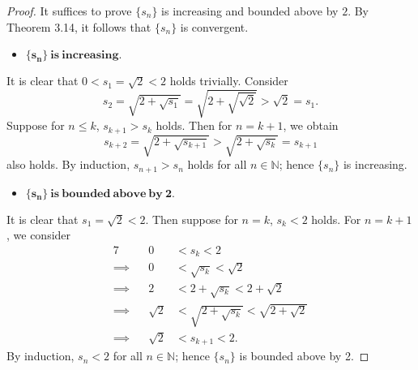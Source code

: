 \begin{Exercise}
\begin{proof}
It suffices to prove $\{s_n\}$ is increasing and bounded above by $2$. By Theorem 3.14, it follows that $\{s_n\}$ is convergent.

\begin{itemize}
\item $\mathbf{\{s_n\}\ is\ increasing.}$ 
\end{itemize}
It is clear that $0<s_1=\sqrt{2}<2$ holds trivially.
Consider
$$
s_2 = \sqrt{2+\sqrt{s_1}} = \sqrt{2+\sqrt{\sqrt{2}}} > \sqrt{2} = s_1.
$$
Suppose for $n\leq k$, $s_{k+1}>s_k$ holds. Then for $n = k+1$, we obtain
$$
s_{k+2} = \sqrt{2+\sqrt{s_{k+1}}} > \sqrt{2+\sqrt{s_k}} = s_{k+1}
$$
also holds. By induction, $s_{n+1}>s_n$ holds for all $n\in\mathbb{N}$; hence $\{s_n\}$ is increasing.

\begin{itemize}
\item $\mathbf{\{s_n\}\ is\ bounded\ above\ by\ 2.}$ 
\end{itemize}
It is clear that $s_1 = \sqrt{2} < 2$. Then suppose for $n=k$, $s_k < 2$ holds. For $n=k+1$, we consider
\begin{alignat*}{7}
\quad&& 0 &<s_k<2 \\
\implies&& 0 &< \sqrt{s_k} < \sqrt{2} \\
\implies&& 2 &< 2+\sqrt{s_k} < 2+\sqrt{2} \\
\implies&& \sqrt{2} &< \sqrt{2+\sqrt{s_k}} < \sqrt{2+\sqrt{2}} \\
\implies&& \sqrt{2} &< s_{k+1} < 2.
\end{alignat*}
By induction, $s_n<2$ for all $n\in\mathbb{N}$; hence $\{s_n\}$ is bounded above by 2.
\end{proof}
\end{Exercise}